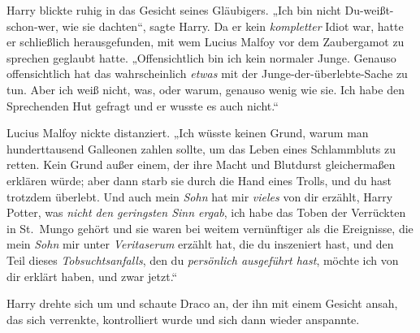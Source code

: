 Harry blickte ruhig in das Gesicht seines Gläubigers.
„Ich bin nicht Du-weißt-schon-wer, wie sie dachten“, sagte Harry. Da er kein \emph{kompletter} Idiot war, hatte er schließlich herausgefunden, mit wem Lucius Malfoy vor dem Zaubergamot zu sprechen geglaubt hatte.
„Offensichtlich bin ich kein normaler Junge. Genauso offensichtlich hat das wahrscheinlich \emph{etwas} mit der Junge-der-überlebte-Sache zu tun. Aber ich weiß nicht, was, oder warum, genauso wenig wie sie. Ich habe den Sprechenden Hut gefragt und er wusste es auch nicht.“

Lucius Malfoy nickte distanziert.
„Ich wüsste keinen Grund, warum man hunderttausend Galleonen zahlen sollte, um das Leben eines Schlammbluts zu retten. Kein Grund außer einem, der ihre Macht und Blutdurst gleichermaßen erklären würde; aber dann starb sie durch die Hand eines Trolls, und du hast trotzdem überlebt. Und auch mein \emph{Sohn} hat mir \emph{vieles} von dir erzählt, Harry Potter, was \emph{nicht den geringsten Sinn ergab}, ich habe das Toben der Verrückten in St.~Mungo gehört und sie waren bei weitem vernünftiger als die Ereignisse, die mein \emph{Sohn} mir unter \emph{Veritaserum} erzählt hat, die du inszeniert hast, und den Teil dieses \emph{Tobsuchtsanfalls}, den du \emph{persönlich ausgeführt hast}, möchte ich von dir erklärt haben, und zwar jetzt.“

Harry drehte sich um und schaute Draco an, der ihn mit einem Gesicht ansah, das sich verrenkte, kontrolliert wurde und sich dann wieder anspannte.

